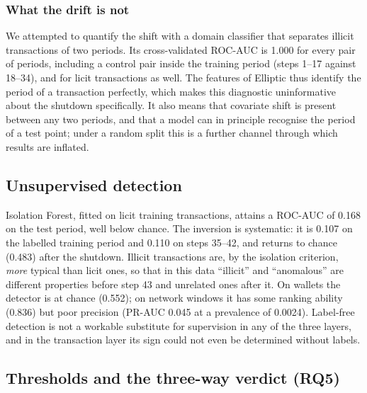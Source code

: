 \subsubsection{What the drift is not} We attempted to quantify the shift with a domain classifier that separates illicit transactions of two periods. Its cross-validated ROC-AUC is 1.000 for every pair of periods, including a control pair inside the training period (steps 1--17 against 18--34), and for licit transactions as well. The features of Elliptic thus identify the period of a transaction perfectly, which makes this diagnostic uninformative about the shutdown specifically. It also means that covariate shift is present between any two periods, and that a model can in principle recognise the period of a test point; under a random split this is a further channel through which results are inflated.

\subsection{Unsupervised detection}\label{sec:res-unsup}
Isolation Forest, fitted on licit training transactions, attains a ROC-AUC of 0.168 on the test period, well below chance. The inversion is systematic: it is 0.107 on the labelled training period and 0.110 on steps 35--42, and returns to chance (0.483) after the shutdown. Illicit transactions are, by the isolation criterion, \emph{more} typical than licit ones, so that in this data ``illicit'' and ``anomalous'' are different properties before step 43 and unrelated ones after it. On wallets the detector is at chance (0.552); on network windows it has some ranking ability (0.836) but poor precision (PR-AUC 0.045 at a prevalence of 0.0024). Label-free detection is not a workable substitute for supervision in any of the three layers, and in the transaction layer its sign could not even be determined without labels.

\subsection{Thresholds and the three-way verdict (RQ5)}\label{sec:res-verdict}

